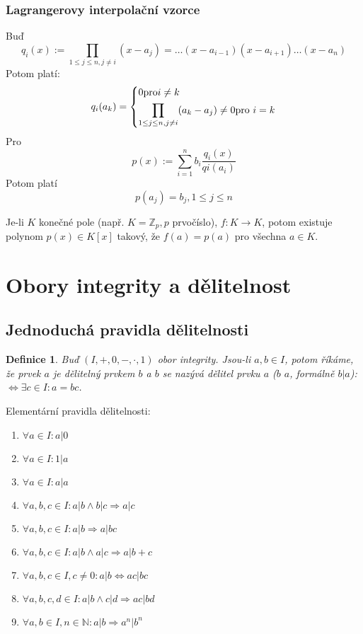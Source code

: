 \documentclass[a4paper, 11pt]{report}
\newtheorem{mydef}{Definice}[chapter]
\begin{document}
\subsubsection{Lagrangerovy interpolační vzorce}
Buď
$$q_i(x) := \prod\limits_{1 \leq j \leq n, j \not=i} (x - a_j) = \dots (x - a_{i-1}) (x - a_{i+1}) \dots (x - a_n)$$
Potom platí:
$$q_i(a_k) =  \begin{dcases}
0 \text{pro} i \not= k \\
\prod\limits_{1 \leq j \leq n, j \not=i} (a_k - a_j) \not= 0 \text{pro } i = k
\end{dcases}$$
Pro 
$$ p(x) := \sum\limits_{i = 1}^n b_i \frac{q_i(x)}{q i (a_i)} $$
Potom platí $$ p(a_j) = b_j, 1 \leq j \leq n $$

Je-li $K$ konečné pole (např. $K = \mathbb{Z}_p, p$ prvočíslo), $f: K \to K$, potom existuje polynom $p(x) \in K[x]$ takový, že $f(a) = p(a)$ pro všechna $a \in K$.


\section{Obory integrity a dělitelnost}
\subsection{Jednoduchá pravidla dělitelnosti}


\begin{mydef}
Buď $(I, +, 0, -, \cdot, 1)$ obor integrity. Jsou-li $a, b \in I$, potom říkáme, že prvek $a$ je dělitelný prvkem $b$ a $b$ se nazývá dělitel prvku $a$ ($b$  $a$, formálně $b|a$): $\Leftrightarrow \exists c \in I: a = bc$.
\end{mydef}

Elementární pravidla dělitelnosti:
\begin{enumerate}[1)]
	\item $\forall a \in I: a | 0$
	\item $\forall a \in I: 1 | a$
	\item $\forall a \in I: a | a$
	\item $\forall a,b,c \in I: a|b \land b|c \Rightarrow a|c$
	\item $\forall a,b,c \in I: a|b \Rightarrow a|bc$
	\item $\forall a,b,c \in I: a|b \land a|c \Rightarrow a|b+c$
	\item $\forall a,b,c \in I, c \not= 0: a|b \Leftrightarrow ac|bc$
	\item $\forall a,b,c,d \in I: a|b \land c|d \Rightarrow ac|bd$
	\item $\forall a,b \in I, n \in \mathbb{N}: a|b \Rightarrow a^n|b^n$
\end{enumerate}
\end{document}
